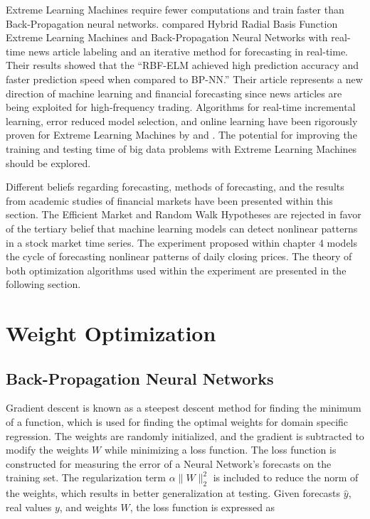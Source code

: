 \documentclass{ncjms}
\begin{document}
	Extreme Learning Machines require fewer computations and train faster than Back-Propagation neural networks. \citet{Li:2016} compared Hybrid Radial Basis Function Extreme Learning Machines and Back-Propagation Neural Networks with real-time news article labeling and an iterative method for forecasting in real-time.
	Their results showed that the ``RBF-ELM achieved high prediction accuracy and faster prediction speed when compared to BP-NN.'' Their article represents a new direction of machine learning and financial forecasting since news articles are being exploited for high-frequency trading.
	Algorithms for real-time incremental learning, error reduced model selection, and online learning have been rigorously proven for Extreme Learning Machines by \citet{Guorui:2009} and \citet{Liang:2006}.
	The potential for improving the training and testing time of big data problems with Extreme Learning Machines should be explored.

	Different beliefs regarding forecasting, methods of forecasting, and the results from academic studies of financial markets have been presented within this section.
	The Efficient Market and Random Walk Hypotheses are rejected in favor of the tertiary belief that machine learning models can detect nonlinear patterns in a stock market time series.
	The experiment proposed within chapter 4 models the cycle of forecasting nonlinear patterns of daily closing prices.
	The theory of both optimization algorithms used within the experiment are presented in the following section.

	\section{Weight Optimization}\label{sec:weight-optimization}

	\subsection{Back-Propagation Neural Networks}\label{subsec:back-propagation-neural-networks}
	Gradient descent is known as a steepest descent method for finding the minimum of a function, which is used for finding the optimal weights for domain specific regression.
	The weights are randomly initialized, and the gradient is subtracted to modify the weights $W$ while minimizing a loss function.
	The loss function is constructed for measuring the error of a Neural Network's forecasts on the training set.
	The regularization term $\alpha \lVert W \rVert_2^2$ is included to reduce the norm of the weights, which results in better generalization at testing.
	Given forecasts $\hat{y}$, real values $y$, and weights $W$, the loss function is expressed as
\end{document}

